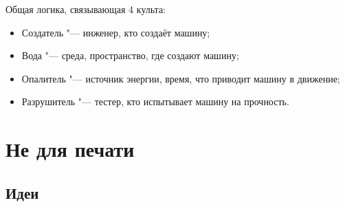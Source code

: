 \documentclass[a4paper,10pt]{book}
\begin{document}
Общая логика, связывающая 4 культа:

\begin{itemize}
\item Создатель "--- инженер, кто создаёт машину;
\item Вода "--- среда, пространство, где создают машину;
\item Опалитель "--- источник энергии, время, что приводит машину в движение;
\item Разрушитель "--- тестер, кто испытывает машину на прочность.
\end{itemize}


\chapter{Не для печати}

\section{Идеи}
\end{document}
